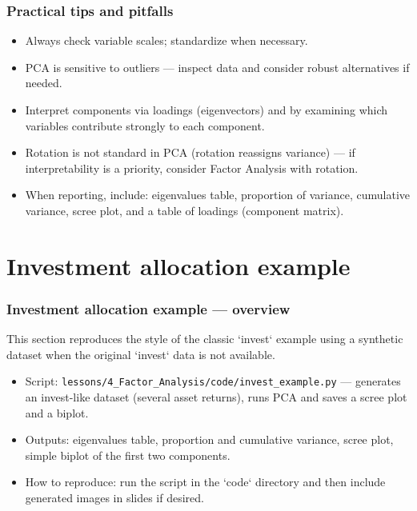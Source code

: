 \documentclass[aspectratio=169]{beamer}
\begin{document}
\begin{frame}
\frametitle{Practical tips and pitfalls}
\begin{itemize}
    \item Always check variable scales; standardize when necessary. \pause
    \item PCA is sensitive to outliers — inspect data and consider robust alternatives if needed. \pause
    \item Interpret components via loadings (eigenvectors) and by examining which variables contribute strongly to each component. \pause
    \item Rotation is not standard in PCA (rotation reassigns variance) — if interpretability is a priority, consider Factor Analysis with rotation. \pause
    \item When reporting, include: eigenvalues table, proportion of variance, cumulative variance, scree plot, and a table of loadings (component matrix). \pause
\end{itemize}
\end{frame}

\section{Investment allocation example}

\begin{frame}
\frametitle{Investment allocation example — overview}
This section reproduces the style of the classic `invest` example using a synthetic dataset when the original `invest` data is not available.
\begin{itemize}
    \item Script: \texttt{lessons/4\_Factor\_Analysis/code/invest\_example.py} — generates an invest-like dataset (several asset returns), runs PCA and saves a scree plot and a biplot. \pause
    \item Outputs: eigenvalues table, proportion and cumulative variance, scree plot, simple biplot of the first two components. \pause
    \item How to reproduce: run the script in the `code` directory and then include generated images in slides if desired. \pause
\end{itemize}
\vspace{6pt}
\end{frame}
\end{document}
